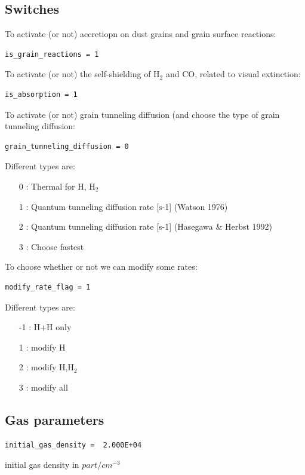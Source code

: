 \documentclass[english,a4paper,twoside]{article}
\newcommand{\molecule}[1]{\ensuremath{\mathrm{#1}}}
\begin{document}
\subsection{Switches}
To activate (or not) accretiopn on dust grains and grain surface reactions:
\begin{verbatim}
is_grain_reactions = 1
\end{verbatim}\label{parameter!is_grain_reaction}

To activate (or not) the self-shielding of $\molecule{H_2}$ and $\molecule{CO}$, related to visual extinction: 
\begin{verbatim}
is_absorption = 1
\end{verbatim}\label{parameter!is_absorption}

To activate (or not) grain tunneling diffusion (and choose the type of grain tunneling diffusion: 
\begin{verbatim}
grain_tunneling_diffusion = 0
\end{verbatim}\label{parameter!grain_tunneling_diffusion}

Different types are:
\begin{itemize}
\item[0] : Thermal for H, \molecule{H_2}
\item[1] : Quantum tunneling diffusion rate [s-1] (Watson 1976)
\item[2] : Quantum tunneling diffusion rate [s-1] (Hasegawa \& Herbst 1992)
\item[3] : Choose fastest
\end{itemize}

To choose whether or not we can modify some rates:
\begin{verbatim}
modify_rate_flag = 1
\end{verbatim}

Different types are:
\begin{itemize}
\item[-1] : H+H only
\item[1] : modify H
\item[2] : modify H,\molecule{H_2}
\item[3] : modify all
\end{itemize}

\subsection{Gas parameters}


\begin{verbatim}
initial_gas_density =  2.000E+04
\end{verbatim}
initial gas density in $\unit{part/cm^{-3}}$
\end{document}
